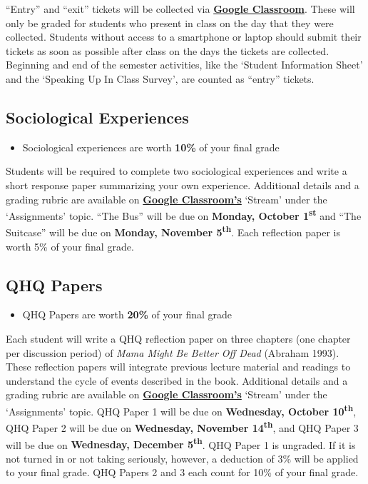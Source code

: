 \documentclass[]{book}
\newenvironment{rmdblock}[1]
  {\begin{shaded*}
  \begin{itemize}
  \renewcommand{\labelitemi}{
    \raisebox{-.7\height}[0pt][0pt]{
      {\setkeys{Gin}{width=3em,keepaspectratio}\texttt{[image: images/\#1]}}
    }
  }
  \item
  }
  {
  \end{itemize}
  \end{shaded*}
  }
\newenvironment{rmdtip}
  {\begin{rmdblock}{tip}}
  {\end{rmdblock}}
\theoremstyle{definition}
\theoremstyle{definition}
\theoremstyle{definition}
\theoremstyle{remark}
\begin{document}
``Entry'' and ``exit'' tickets will be collected via
\textbf{\href{https://classroom.google.com}{Google Classroom}}. These
will only be graded for students who present in class on the day that
they were collected. Students without access to a smartphone or laptop
should submit their tickets as soon as possible after class on the days
the tickets are collected. Beginning and end of the semester activities,
like the `Student Information Sheet' and the `Speaking Up In Class
Survey', are counted as ``entry'' tickets.

\hypertarget{sociological-experiences}{%
\subsection{Sociological Experiences}\label{sociological-experiences}}

\begin{rmdtip}
Sociological experiences are worth \textbf{10\%} of your final grade
\end{rmdtip}

Students will be required to complete two sociological experiences and
write a short response paper summarizing your own experience. Additional
details and a grading rubric are available on
\textbf{\href{https://classroom.google.com}{Google Classroom's}}
`Stream' under the `Assignments' topic. ``The Bus'' will be due on
\textbf{Monday, October 1\textsuperscript{st}} and ``The Suitcase'' will
be due on \textbf{Monday, November 5\textsuperscript{th}}. Each
reflection paper is worth 5\% of your final grade.

\hypertarget{qhq-papers}{%
\subsection{QHQ Papers}\label{qhq-papers}}

\begin{rmdtip}
QHQ Papers are worth \textbf{20\%} of your final grade
\end{rmdtip}

Each student will write a QHQ reflection paper on three chapters (one
chapter per discussion period) of \emph{Mama Might Be Better Off Dead}
(Abraham 1993). These reflection papers will integrate previous lecture
material and readings to understand the cycle of events described in the
book. Additional details and a grading rubric are available on
\textbf{\href{https://classroom.google.com}{Google Classroom's}}
`Stream' under the `Assignments' topic. QHQ Paper 1 will be due on
\textbf{Wednesday, October 10\textsuperscript{th}}, QHQ Paper 2 will be
due on \textbf{Wednesday, November 14\textsuperscript{th}}, and QHQ
Paper 3 will be due on \textbf{Wednesday, December
5\textsuperscript{th}}. QHQ Paper 1 is ungraded. If it is not turned in
or not taking seriously, however, a deduction of 3\% will be applied to
your final grade. QHQ Papers 2 and 3 each count for 10\% of your final
grade.
\end{document}
